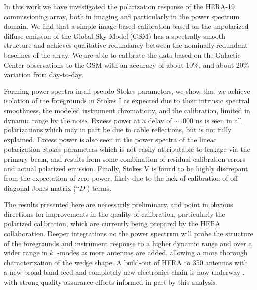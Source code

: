 \documentclass[twocolumn, trackchanges]{aastex61}
\begin{document}
{In this work we have investigated the polarization response of the HERA-19 commissioning array, both in imaging and particularly in the  power spectrum domain.
We find that a simple image-based calibration based on the unpolarized diffuse emission of the Global Sky Model (GSM) has a spectrally smooth structure and achieves qualitative redundancy between the nominally-redundant baselines of the array.  We are able to calibrate the data based on the Galactic Center observations to the GSM with an accuracy of about 10\%, and about 20\% variation from day-to-day.  

Forming power spectra in all pseudo-Stokes parameters, we show that we achieve isolation of the foregrounds in Stokes I as expected due to their intrinsic spectral smoothness, the modeled instrument chromaticity, and the calibration, limited in dynamic range by the noise.  Excess power at a delay of $\sim1000$ ns is seen in all polarizations which may in part be due to cable reflections, but is not fully explained.  
Excess power is also seen in the power spectra of the linear polarization Stokes parameters which is not easily attributable to leakage via the primary beam, and results from some combination of residual calibration errors and actual polarized emission.  
Finally, Stokes V is found to be highly discrepant from the expectation of zero power, likely due to the lack of calibration of off-diagonal Jones matrix (``$D$") terms.

The results presented here are necessarily preliminary, and point in obvious directions for improvements in the quality of calibration, particularly the polarized calibration, which are currently being prepared by the HERA collaboration.  Deeper integrations no the power spectrum will probe the structure of the foregrounds and instrument response to a higher dynamic range and over a wider range in $k_{\perp}$-modes as more antennas are added, allowing a more thorough characterization of the wedge shape.  A build-out of HERA to 350 antennas with a new broad-band feed and completely new electronics chain is now underway \cite{deBoer17}, with strong quality-assurance efforts informed in part by this analysis.  

}

\acknowledgements
\end{document}
